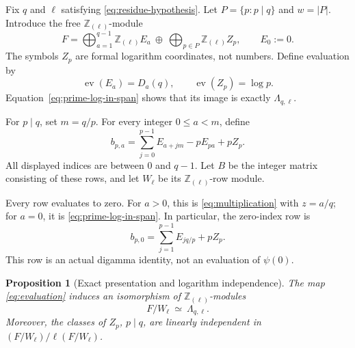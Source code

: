\documentclass[11pt,a4paper]{article}
\newtheorem{proposition}[theorem]{Proposition}
\theoremstyle{definition}
\theoremstyle{remark}
\newcommand{\Z}{\mathbb Z}
\newcommand{\Zloc}{\Z_{(\ell)}}
\begin{document}
Fix $q$ and $\ell$ satisfying \eqref{eq:residue-hypothesis}. Let
$P=\{p:p\mid q\}$ and $w=|P|$. Introduce the free $\Zloc$-module
\[
 F=\bigoplus_{a=1}^{q-1}\Zloc E_a
   \ \oplus\ \bigoplus_{p\in P}\Zloc Z_p,
 \qquad E_0:=0.
\]
The symbols $Z_p$ are formal logarithm coordinates, not numbers. Define
evaluation by
\begin{equation}\label{eq:evaluation}
 \operatorname{ev}(E_a)=D_a(q),\qquad
 \operatorname{ev}(Z_p)=\log p.
\end{equation}
Equation~\eqref{eq:prime-log-in-span} shows that its image is exactly
$\Lambda_{q,\ell}$.

For $p\mid q$, set $m=q/p$. For every integer $0\le a<m$, define
\begin{equation}\label{eq:augmented-row}
 b_{p,a}=\sum_{j=0}^{p-1}E_{a+jm}-pE_{pa}+pZ_p.
\end{equation}
All displayed indices are between $0$ and $q-1$. Let $B$ be the
integer matrix consisting of these rows, and let $W_\ell$ be its
$\Zloc$-row module.

Every row evaluates to zero. For $a>0$, this is
\eqref{eq:multiplication} with $z=a/q$; for $a=0$, it is
\eqref{eq:prime-log-in-span}. In particular, the zero-index row is
\begin{equation}\label{eq:zero-row}
 b_{p,0}=\sum_{j=1}^{p-1}E_{jq/p}+pZ_p.
\end{equation}
This row is an actual digamma identity, not an evaluation of $\psi(0)$.

\begin{proposition}[Exact presentation and logarithm independence]
\label{prop:presentation}
The map \eqref{eq:evaluation} induces an isomorphism of
$\Zloc$-modules
\begin{equation}\label{eq:module-isomorphism}
 F/W_\ell\ \simeq\ \Lambda_{q,\ell}.
\end{equation}
Moreover, the classes of $Z_p$, $p\mid q$, are linearly independent
in $(F/W_\ell)/\ell(F/W_\ell)$.
\end{proposition}
\end{document}
